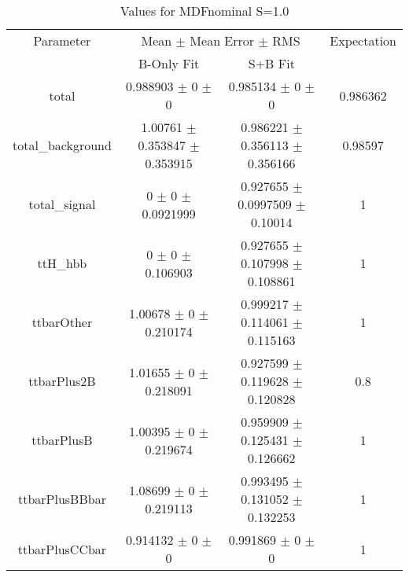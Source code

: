 \begin{table}
\centering
\caption{Values for MDFnominal S=1.0}
\begin{tabular}{cccc}
\toprule
Parameter & \multicolumn{2}{c}{Mean $\pm$ Mean Error $\pm$ RMS} & Expectation\\
 & B-Only Fit & S+B Fit & \\
\midrule
total & \num{0.988903} $\pm$ \num{0} $\pm$ \num{0} & \num{0.985134} $\pm$ \num{0} $\pm$ \num{0} & \num{0.986362}\\
total\_background & \num{1.00761} $\pm$ \num{0.353847} $\pm$ \num{0.353915} & \num{0.986221} $\pm$ \num{0.356113} $\pm$ \num{0.356166} & \num{0.98597}\\
total\_signal & \num{0} $\pm$ \num{0} $\pm$ \num{0.0921999} & \num{0.927655} $\pm$ \num{0.0997509} $\pm$ \num{0.10014} & \num{1}\\
ttH\_hbb & \num{0} $\pm$ \num{0} $\pm$ \num{0.106903} & \num{0.927655} $\pm$ \num{0.107998} $\pm$ \num{0.108861} & \num{1}\\
ttbarOther & \num{1.00678} $\pm$ \num{0} $\pm$ \num{0.210174} & \num{0.999217} $\pm$ \num{0.114061} $\pm$ \num{0.115163} & \num{1}\\
ttbarPlus2B & \num{1.01655} $\pm$ \num{0} $\pm$ \num{0.218091} & \num{0.927599} $\pm$ \num{0.119628} $\pm$ \num{0.120828} & \num{0.8}\\
ttbarPlusB & \num{1.00395} $\pm$ \num{0} $\pm$ \num{0.219674} & \num{0.959909} $\pm$ \num{0.125431} $\pm$ \num{0.126662} & \num{1}\\
ttbarPlusBBbar & \num{1.08699} $\pm$ \num{0} $\pm$ \num{0.219113} & \num{0.993495} $\pm$ \num{0.131052} $\pm$ \num{0.132253} & \num{1}\\
ttbarPlusCCbar & \num{0.914132} $\pm$ \num{0} $\pm$ \num{0} & \num{0.991869} $\pm$ \num{0} $\pm$ \num{0} & \num{1}\\
\bottomrule
\end{tabular}
\end{table}
